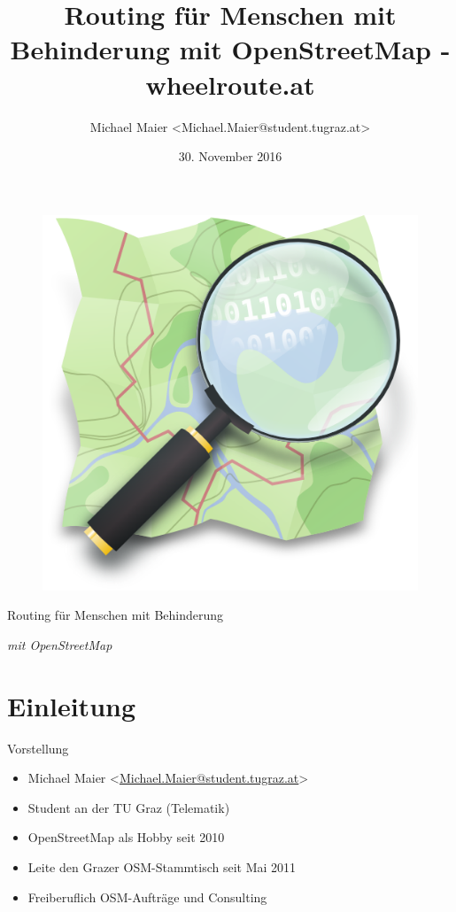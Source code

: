 \documentclass{beamer}
\title{Routing für Menschen mit Behinderung mit OpenStreetMap - wheelroute.at}
\author{Michael Maier \textless Michael.Maier@student.tugraz.at\textgreater}
\date{30. November 2016}
\begin{document}

\begin{frame} 


\begin{figure}
  \centering
  \includegraphics[width=.4\textwidth]{mag_map.png}
\end{figure}

\begin{center}
\Huge{Routing für Menschen mit Behinderung\\}
\end{center}

\begin{center}
\Large{\emph{mit OpenStreetMap}}
\end{center}

\end{frame}


\section{Einleitung}

\begin{frame}{Vorstellung}

  \begin{itemize}
    \item Michael Maier \textless \href{mailto:Michael.Maier@student.tugraz.at}{Michael.Maier@student.tugraz.at}\textgreater
    \item Student an der TU Graz (Telematik)
\vspace{0.3cm}
    \item OpenStreetMap als Hobby seit 2010
    \item Leite den Grazer OSM-Stammtisch seit Mai 2011
\vspace{0.3cm}
    \item Freiberuflich OSM-Aufträge und Consulting
  \end{itemize}
\end{frame}
\end{document}
